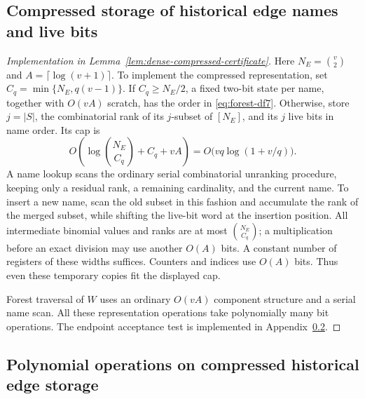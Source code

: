 \documentclass[11pt,letterpaper]{article}
\numberwithin{equation}{section}
\begin{document}
\subsection{Compressed storage of historical edge names and live bits}
\label{app:certificate-representation}

\begin{proof}[Implementation in Lemma~\ref{lem:dense-compressed-certificate}]
Here $N_E=\binom{v}{2}$ and $A=\lceil\log(v+1)\rceil$.
To implement the compressed representation, set $C_q=\min\{N_E,q(v-1)\}$.
If $C_q\ge N_E/2$, a fixed two-bit state per name, together with $O(vA)$ scratch, has the order in \eqref{eq:forest-df7}.
Otherwise, store $j=|S|$, the combinatorial rank of its $j$-subset of $[N_E]$, and its $j$ live bits in name order.
Its cap is
\[
 O\left(\log\binom{N_E}{C_q}+C_q+vA\right)
 =O\bigl(vq\log(1+v/q)\bigr).
\]
A name lookup scans the ordinary serial combinatorial unranking procedure, keeping only a residual rank, a remaining cardinality, and the current name.
To insert a new name, scan the old subset in this fashion and accumulate the rank of the merged subset, while shifting the live-bit word at the insertion position.
All intermediate binomial values and ranks are at most $\binom{N_E}{C_q}$; a multiplication before an exact division may use another $O(A)$ bits.
A constant number of registers of these widths suffices.
Counters and indices use $O(A)$ bits.
Thus even these temporary copies fit the displayed cap.

Forest traversal of $W$ uses an ordinary $O(vA)$ component structure and a serial name scan.
All these representation operations take polynomially many bit operations.
The endpoint acceptance test is implemented in Appendix~\ref{app:certificate-polynomial}.
\end{proof}


\subsection{Polynomial operations on compressed historical edge storage}
\label{app:certificate-polynomial}
\end{document}

